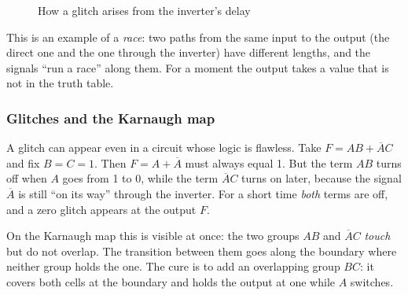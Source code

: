 \begin{figure}[H]
\centering
{}
\caption{How a glitch arises from the inverter's delay}
\end{figure}

This is an example of a \emph{race}: two paths from the same input to the
output (the direct one and the one through the inverter) have different
lengths, and the signals ``run a race'' along them. For a moment the output
takes a value that is not in the truth table.

\subsubsection{Glitches and the Karnaugh map}

A glitch can appear even in a circuit whose logic is flawless. Take
$F = AB + \overline{A}C$ and fix $B=C=1$. Then $F = A + \overline{A}$ must
always equal 1. But the term $AB$ turns off when $A$ goes from 1 to 0, while
the term $\overline{A}C$ turns on later, because the signal $\overline{A}$ is
still ``on its way'' through the inverter. For a short time \emph{both} terms
are off, and a zero glitch appears at the output $F$.

On the Karnaugh map this is visible at once: the two groups $AB$ and
$\overline{A}C$ \emph{touch} but do not overlap. The transition between them
goes along the boundary where neither group holds the one. The cure is to add
an overlapping group $BC$: it covers both cells at the boundary and holds the
output at one while $A$ switches.

